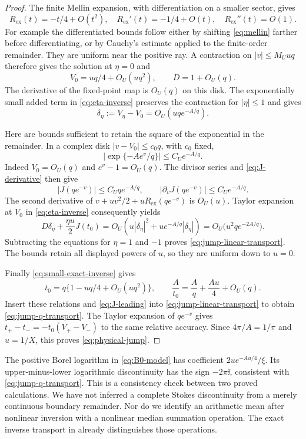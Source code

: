\begin{proof}
The finite Mellin expansion, with differentiation on a smaller sector,
gives
\[
 R_{\mathrm{ex}}(t)=-t/4+O(t^2),\quad
 R_{\mathrm{ex}}'(t)=-1/4+O(t),\quad
 R_{\mathrm{ex}}''(t)=O(1).
\]
For example the differentiated bounds follow either by shifting
\eqref{eq:mellin} farther before differentiating, or by Cauchy's estimate
applied to the finite-order remainder. They are uniform near the
positive ray. A contraction on $|v|\le M_Uu q$ therefore gives the
solution at $\eta=0$ and
\begin{equation}\label{eq:small-exact-inverse}
 V_0=uq/4+O_U(uq^2),\qquad D=1+O_U(q).
\end{equation}
The derivative of the fixed-point map is $O_U(q)$ on this disk.
The exponentially small added term in \eqref{eq:eta-inverse} preserves
the contraction for $|\eta|\le1$ and gives
\[
 \delta_\eta:=V_\eta-V_0=O_U(uq e^{-A/q}).
\]

Here are bounds sufficient to retain the square of the exponential in
the remainder. In a complex disk $|v-V_0|\le c_0q$, with $c_0$ fixed,
\[
 \left|\exp\{-A e^v/q\}\right|\le C_U e^{-A/q}.
\]
Indeed $V_0=O_U(q)$ and $e^v-1=O_U(q)$. The divisor series and
\eqref{eq:J-derivative} then give
\[
 |J(qe^{-v})|\le C_Uq e^{-A/q},\qquad
 |\partial_v J(qe^{-v})|\le C_Ue^{-A/q}.
\]
The second derivative of
$v+uv^2/2+uR_{\mathrm{ex}}(qe^{-v})$ is $O_U(u)$.
Taylor expansion at $V_0$ in \eqref{eq:eta-inverse} consequently yields
\[
 D\delta_\eta+\frac{\eta u}{2}J(t_0)
 =O_U\!\left(u|\delta_\eta|^2+
                    u e^{-A/q}|\delta_\eta|\right)
 =O_U\bigl(u^2q e^{-2A/q}\bigr).
\]
Subtracting the equations for $\eta=1$ and $-1$ proves
\eqref{eq:jump-linear-transport}. The bounds retain all displayed
powers of $u$, so they are uniform down to $u=0$.

Finally \eqref{eq:small-exact-inverse} gives
\[
 t_0=q\{1-uq/4+O_U(uq^2)\},\qquad
 \frac A{t_0}=\frac Aq+\frac{Au}{4}+O_U(q).
\]
Insert these relations and \eqref{eq:J-leading} into
\eqref{eq:jump-linear-transport} to obtain
\eqref{eq:jump-q-transport}. The Taylor expansion of $qe^{-v}$ gives
$t_+-t_-=-t_0(V_+-V_-)$ to the same relative accuracy.
Since $4\pi/A=1/\pi$ and $u=1/X$, this proves
\eqref{eq:physical-jump}.
\end{proof}

The positive Borel logarithm in \eqref{eq:B0-model} has coefficient
$2u e^{-Au/4}/\xi$. Its upper-minus-lower logarithmic discontinuity has
the sign $-2\pi\ii$, consistent with \eqref{eq:jump-q-transport}.
This is a consistency check between two proved calculations. We have
not inferred a complete Stokes discontinuity from a merely continuous
boundary remainder. Nor do we identify an arithmetic mean after nonlinear
inversion with a nonlinear median summation operation. The exact inverse
transport in \cite[Section 8]{incoming} already distinguishes those
operations.

